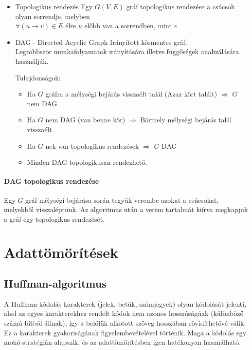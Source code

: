 \documentclass[margin=0px]{article}
\begin{document}
	\begin{itemize}
        \item Topologikus rendezés
        Egy $G(V,E)$ gráf topologikus rendezése a csúcsok olyan sorrendje, melyben \\
        $\forall (u\rightarrow v) \in E$ élre $u$ előbb van a sorrendben, mint $v$
        \item DAG - Directed Acyclic Graph
            Irányított körmentes gráf. \\
            Legtöbbször munkafolyamatok irányítására illetve függőségek analizálására használják.
							
			Tulajdonságok:
			\begin{itemize}
                \item Ha $G$ gráfra a mélységi bejárás visszaélt talál (Azaz kört talált) $\Longrightarrow$ $G$ nem DAG
				\item Ha $G$ nem DAG (van benne kör) $\Longrightarrow$ Bármely mélységi bejárás talál visszaélt
                \item Ha $G$-nek van topologikus rendezések $\Longrightarrow$ $G$ DAG
                \item Minden DAG topologikusan rendezhető.
            \end{itemize}
	\end{itemize}
	\paragraph*{DAG topologikus rendezése\\}

    Egy $G$ gráf mélységi bejárása során tegyük verembe azokat a csúcsokat, melyekből visszaléptünk. Az algoritmus után a verem tartalmát kiírva megkapjuk a gráf egy topologikus rendezését.

	\section*{Adattömörítések}

	\subsection*{Huffman-algoritmus}

    \noindent A Huffman-kódolás karakterek (jelek, betűk, számjegyek) olyan kódolását jelenti, ahol az egyes karakterekhez rendelt kódok nem azonos hosszúságúak (különböző számú bitből állnak), így a belőlük alkotott szöveg hosszában rövidíthetővé válik. Ez a karakterek gyakoriságának figyelembevételével történik. Maga a kódolás egy mohó stratégián alapszik, és az adattömörítésben igen hatékonyan használható.\\
\end{document}
